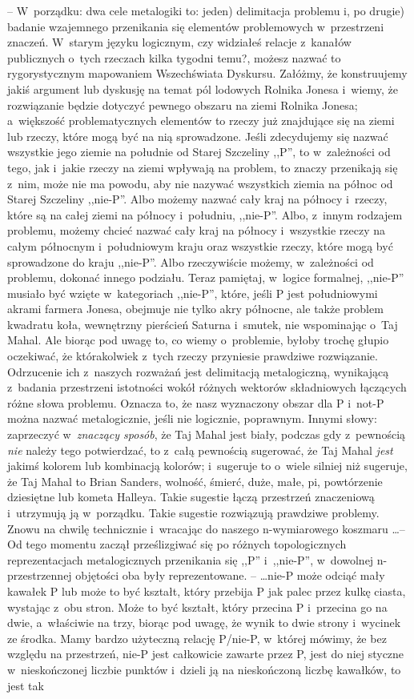 \documentclass[oneside,polish,11pt,rmheadings]{mwbk}
\begin{document}
-- W~porządku: dwa cele metalogiki to: jeden) delimitacja problemu i, po drugie) badanie wzajemnego przenikania się elementów problemowych w~przestrzeni znaczeń. W~starym języku logicznym, czy widziałeś relacje z~kanałów publicznych o~tych rzeczach kilka tygodni temu?, możesz nazwać to rygorystycznym mapowaniem Wszechświata Dyskursu. Załóżmy, że konstruujemy jakiś argument lub dyskusję na temat pól lodowych Rolnika Jonesa i~wiemy, że rozwiązanie będzie dotyczyć pewnego obszaru na ziemi Rolnika Jonesa; a~większość problematycznych elementów to rzeczy już znajdujące się na ziemi lub rzeczy, które mogą być na nią sprowadzone. Jeśli zdecydujemy się nazwać wszystkie jego ziemie na południe od Starej Szczeliny ,,P'', to w~zależności od tego, jak i~jakie rzeczy na ziemi wpływają na problem, to znaczy przenikają się z~nim, może nie ma powodu, aby nie nazywać wszystkich ziemia na północ od Starej Szczeliny ,,nie-P''. Albo możemy nazwać cały kraj na północy i~rzeczy, które są na całej ziemi na północy i~południu, ,,nie-P''. Albo, z~innym rodzajem problemu, możemy chcieć nazwać cały kraj na północy i~wszystkie rzeczy na całym północnym i~południowym kraju oraz wszystkie rzeczy, które mogą być sprowadzone do kraju ,,nie-P''. Albo rzeczywiście możemy, w~zależności od problemu, dokonać innego podziału. Teraz pamiętaj, w~logice formalnej, ,,nie-P'' musiało być wzięte w~kategoriach ,,nie-P'', które, jeśli P jest południowymi akrami farmera Jonesa, obejmuje nie tylko akry północne, ale także problem kwadratu koła, wewnętrzny pierścień Saturna i~smutek, nie wspominając o~Taj Mahal. Ale biorąc pod uwagę to, co wiemy o~problemie, byłoby trochę głupio oczekiwać, że którakolwiek z~tych rzeczy przyniesie prawdziwe rozwiązanie. Odrzucenie ich z~naszych rozważań jest delimitacją metalogiczną, wynikającą z~badania przestrzeni istotności wokół różnych wektorów składniowych łączących różne słowa problemu. Oznacza to, że nasz wyznaczony obszar dla P i~not-P można nazwać metalogicznie, jeśli nie logicznie, poprawnym.  Innymi słowy: zaprzeczyć w~\textit{znaczący sposób}, że Taj Mahal jest biały, podczas gdy z~pewnością \textit{nie }należy tego potwierdzać, to z~całą pewnością sugerować, że Taj Mahal \textit{jest }jakimś kolorem lub kombinacją kolorów; i~sugeruje to o~wiele silniej niż sugeruje, że Taj Mahal to Brian Sanders, wolność, śmierć, duże, małe, pi, powtórzenie dziesiętne lub kometa Halleya. Takie sugestie łączą przestrzeń znaczeniową i~utrzymują ją w~porządku. Takie sugestie rozwiązują prawdziwe problemy. Znowu na chwilę technicznie i~wracając do naszego n-wymiarowego koszmaru  \ldots  -- Od tego momentu zaczął prześlizgiwać się po różnych topologicznych reprezentacjach metalogicznych przenikania się ,,P'' i~,,nie-P'', w~dowolnej n-przestrzennej objętości oba były reprezentowane. --  \ldots  nie-P może odciąć mały kawałek P lub może to być kształt, który przebija P jak palec przez kulkę ciasta, wystając z~obu stron. Może to być kształt, który przecina P i~przecina go na dwie, a~właściwie na trzy, biorąc pod uwagę, że wynik to dwie strony i~wycinek ze środka.  Mamy bardzo użyteczną relację P/nie-P, w~której mówimy, że bez względu na przestrzeń, nie-P jest całkowicie zawarte przez P, jest do niej styczne w~nieskończonej liczbie punktów i~dzieli ją na nieskończoną liczbę kawałków, to jest tak 
\end{document}
